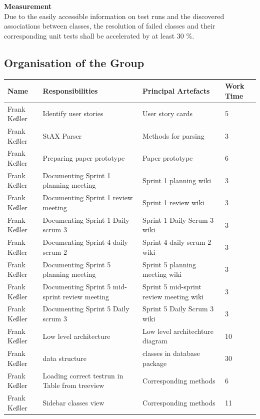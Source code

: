 {\large\textbf{Measurement}}\\ 
Due to the easily accessible information on test runs and the discovered associations between classes, the resolution of failed classes and their corresponding unit tests shall be accelerated by at least 30 \%. 

\subsection{Organisation of the Group}
\begin{longtable}{|p{}||p{}|p{}|p{}|}
  \hline
  
  
    Name & Responsibilities & Principal Artefacts & Work Time\\
    \hline
    \hline
    Frank Keßler & Identify user stories & User story cards & 5 \\
    \hline
    Frank Keßler & StAX Parser & Methods for parsing & 3 \\ 
    \hline
    Frank Keßler & Preparing paper prototype & Paper prototype & 6 \\ 
    \hline
    Frank Keßler & Documenting Sprint 1 planning meeting & Sprint 1 planning wiki & 3 \\
    \hline
    Frank Keßler & Documenting Sprint 1 review meeting & Sprint 1 review wiki & 3 \\
	\hline
	Frank Keßler & Documenting Sprint 1 Daily scrum 3 & Sprint 1 Daily Scrum 3 wiki & 3 \\
	\hline
    Frank Keßler & Documenting Sprint 4 daily scrum 2 & Sprint 4 daily scrum 2 wiki & 3 \\
	\hline
	Frank Keßler & Documenting Sprint 5 planning meeting & Sprint 5 planning meeting wiki & 3 \\
	\hline
	Frank Keßler & Documenting Sprint 5 mid-sprint review meeting & Sprint 5 mid-sprint review meeting wiki & 3 \\
	\hline
	Frank Keßler & Documenting Sprint 5 Daily scrum 3 & Sprint 5 Daily Scrum 3 wiki & 3 \\
	\hline
    Frank Keßler & Low level architecture & Low level architechture diagram & 10 \\ 
    \hline
    Frank Keßler & data structure & classes in database package & 30 \\ 
    \hline 
    Frank Keßler & Loading correct testrun in Table from treeview & Corresponding methods & 6 \\ 
    \hline
    Frank Keßler & Sidebar classes view & Corresponding methods & 11 \\ 

\end{longtable}
